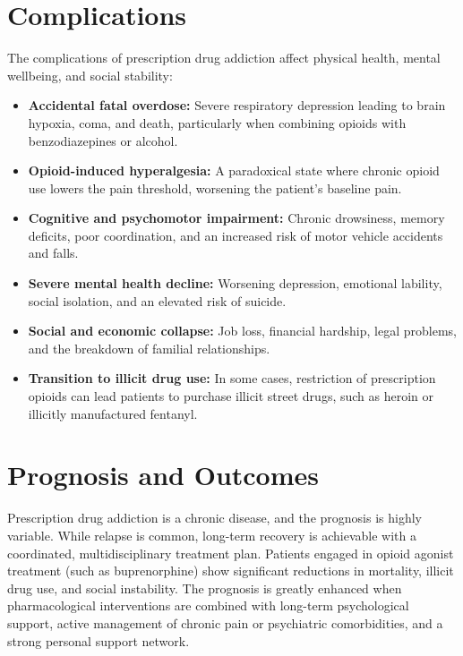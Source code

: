 \section*{Complications}
The complications of prescription drug addiction affect physical health, mental wellbeing, and social stability:
\begin{itemize}
    \item \textbf{Accidental fatal overdose:} Severe respiratory depression leading to brain hypoxia, coma, and death, particularly when combining opioids with benzodiazepines or alcohol.
    \item \textbf{Opioid-induced hyperalgesia:} A paradoxical state where chronic opioid use lowers the pain threshold, worsening the patient's baseline pain.
    \item \textbf{Cognitive and psychomotor impairment:} Chronic drowsiness, memory deficits, poor coordination, and an increased risk of motor vehicle accidents and falls.
    \item \textbf{Severe mental health decline:} Worsening depression, emotional lability, social isolation, and an elevated risk of suicide.
    \item \textbf{Social and economic collapse:} Job loss, financial hardship, legal problems, and the breakdown of familial relationships.
    \item \textbf{Transition to illicit drug use:} In some cases, restriction of prescription opioids can lead patients to purchase illicit street drugs, such as heroin or illicitly manufactured fentanyl.
\end{itemize}

\section*{Prognosis and Outcomes}
Prescription drug addiction is a chronic disease, and the prognosis is highly variable. While relapse is common, long-term recovery is achievable with a coordinated, multidisciplinary treatment plan. Patients engaged in opioid agonist treatment (such as buprenorphine) show significant reductions in mortality, illicit drug use, and social instability. The prognosis is greatly enhanced when pharmacological interventions are combined with long-term psychological support, active management of chronic pain or psychiatric comorbidities, and a strong personal support network.

